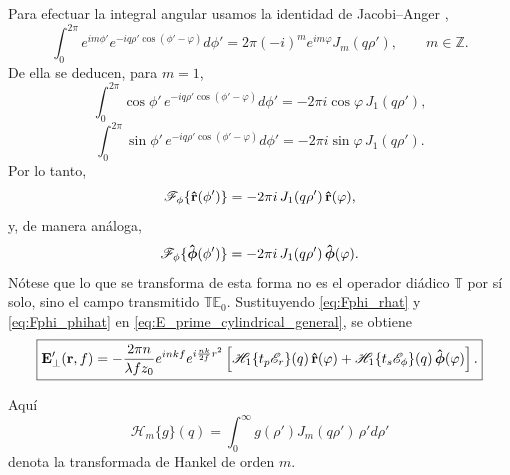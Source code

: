 Para efectuar la integral angular usamos la identidad de Jacobi--Anger \cite{Watson1944},
\begin{equation}
  \int_0^{2\pi}
  e^{im\phi'}
  e^{-iq\rho'\cos(\phi'-\varphi)}
  d\phi'
  =
  2\pi(-i)^m e^{im\varphi}J_m(q\rho'),
  \qquad m\in\mathbb Z.
  \label{eq:jacobi_anger_cylindrical}
\end{equation}
De ella se deducen, para $m=1$,
\begin{equation}
  \int_0^{2\pi}
  \cos\phi'\,
  e^{-iq\rho'\cos(\phi'-\varphi)}
  d\phi'
  =
  -2\pi i\cos\varphi\,J_1(q\rho'),
\end{equation}
\begin{equation}
  \int_0^{2\pi}
  \sin\phi'\,
  e^{-iq\rho'\cos(\phi'-\varphi)}
  d\phi'
  =
  -2\pi i\sin\varphi\,J_1(q\rho').
\end{equation}
Por lo tanto,
\begin{equation}
  \mathscr F_\phi\{\bm{\hat{\mathbf{r}}}(\phi')\}
  =
  -2\pi i\,J_1(q\rho')\,\bm{\hat{\mathbf{r}}}(\varphi),
  \label{eq:Fphi_rhat}
\end{equation}
y, de manera análoga,
\begin{equation}
  \mathscr F_\phi\{\bm{\hat{\mathbf{\phi}}}(\phi')\}
  =
  -2\pi i\,J_1(q\rho')\,\bm{\hat{\mathbf{\phi}}}(\varphi).
  \label{eq:Fphi_phihat}
\end{equation}
Nótese que lo que se transforma de esta forma no es el operador diádico $\mathbb T$ por sí solo, sino el campo transmitido $\mathbb T\mathbb E_0$. Sustituyendo \eqref{eq:Fphi_rhat} y \eqref{eq:Fphi_phihat} en \eqref{eq:E_prime_cylindrical_general}, se obtiene
\begin{equation}
\boxed{
  \vb E'_\perp(\vb r,f)
  =
  -\frac{2\pi n}{\lambda f z_0}
  e^{inkf}
  e^{i\frac{nk}{2f}r^2}
  \left[
    \mathscr H_1\{t_p\mathscr E_r\}(q)\,\bm{\hat{\mathbf{r}}}(\varphi)
    +
    \mathscr H_1\{t_s\mathscr E_\phi\}(q)\,\bm{\hat{\mathbf{\phi}}}(\varphi)
  \right].
}
\label{eq:E_field_cylindrical_Hankel}
\end{equation}

Aquí
\begin{equation}
  \mathscr H_m\{g\}(q)
  =
  \int_0^\infty
  g(\rho')J_m(q\rho')\,\rho' d\rho'
  \label{eq:Hankel_definition_cylindrical}
\end{equation}
denota la transformada de Hankel de orden $m$.

